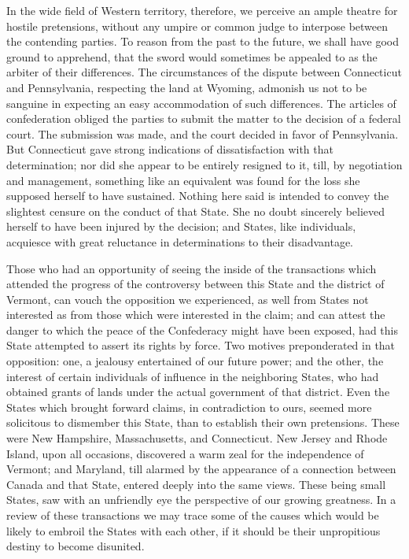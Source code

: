 In the wide field of Western territory, therefore, we perceive an ample theatre for hostile pretensions, without any umpire or common judge to interpose between the contending parties. 
To reason from the past to the future, we shall have good ground to apprehend, that the sword would sometimes be appealed to as the arbiter of their differences. 
The circumstances of the dispute between Connecticut and Pennsylvania, respecting the land at Wyoming, admonish us not to be sanguine in expecting an easy accommodation of such differences. 
The articles of confederation obliged the parties to submit the matter to the decision of a federal court. 
The submission was made, and the court decided in favor of Pennsylvania. 
But Connecticut gave strong indications of dissatisfaction with that determination; nor did she appear to be entirely resigned to it, till, by negotiation and management, something like an equivalent was found for the loss she supposed herself to have sustained. 
Nothing here said is intended to convey the slightest censure on the conduct of that State. 
She no doubt sincerely believed herself to have been injured by the decision; and States, like individuals, acquiesce with great reluctance in determinations to their disadvantage.

Those who had an opportunity of seeing the inside of the transactions which attended the progress of the controversy between this State and the district of Vermont, can vouch the opposition we experienced, as well from States not interested as from those which were interested in the claim; and can attest the danger to which the peace of the Confederacy might have been exposed, had this State attempted to assert its rights by force. 
Two motives preponderated in that opposition: one, a jealousy entertained of our future power; and the other, the interest of certain individuals of influence in the neighboring States, who had obtained grants of lands under the actual government of that district. 
Even the States which brought forward claims, in contradiction to ours, seemed more solicitous to dismember this State, than to establish their own pretensions. 
These were New Hampshire, Massachusetts, and Connecticut. 
New Jersey and Rhode Island, upon all occasions, discovered a warm zeal for the independence of Vermont; and Maryland, till alarmed by the appearance of a connection between Canada and that State, entered deeply into the same views. 
These being small States, saw with an unfriendly eye the perspective of our growing greatness. 
In a review of these transactions we may trace some of the causes which would be likely to embroil the States with each other, if it should be their unpropitious destiny to become disunited.

